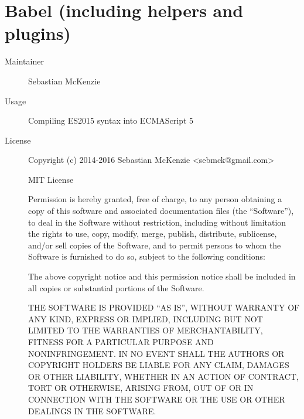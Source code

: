   \section*{Babel (including helpers and plugins)}
    \begin{description}
      \item[Maintainer] Sebastian McKenzie
      \item[Usage] Compiling ES2015 syntax into ECMAScript 5
      \item[License] \scriptsize Copyright (c) 2014-2016 Sebastian McKenzie <sebmck@gmail.com>

        MIT License

        Permission is hereby granted, free of charge, to any person obtaining
        a copy of this software and associated documentation files (the
        ``Software''), to deal in the Software without restriction, including
        without limitation the rights to use, copy, modify, merge, publish,
        distribute, sublicense, and/or sell copies of the Software, and to
        permit persons to whom the Software is furnished to do so, subject to
        the following conditions:

        The above copyright notice and this permission notice shall be
        included in all copies or substantial portions of the Software.

        THE SOFTWARE IS PROVIDED ``AS IS'', WITHOUT WARRANTY OF ANY KIND,
        EXPRESS OR IMPLIED, INCLUDING BUT NOT LIMITED TO THE WARRANTIES OF
        MERCHANTABILITY, FITNESS FOR A PARTICULAR PURPOSE AND
        NONINFRINGEMENT. IN NO EVENT SHALL THE AUTHORS OR COPYRIGHT HOLDERS BE
        LIABLE FOR ANY CLAIM, DAMAGES OR OTHER LIABILITY, WHETHER IN AN ACTION
        OF CONTRACT, TORT OR OTHERWISE, ARISING FROM, OUT OF OR IN CONNECTION
        WITH THE SOFTWARE OR THE USE OR OTHER DEALINGS IN THE SOFTWARE.
    \end{description}

